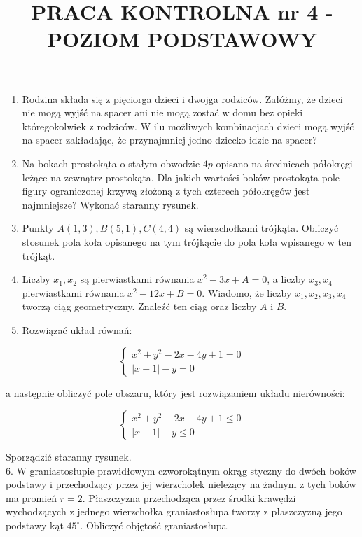 \documentclass[10pt]{article}
\title{PRACA KONTROLNA nr 4 - POZIOM PODSTAWOWY }
\author{}
\date{}
\begin{document}
\maketitle
\begin{enumerate}
  \item Rodzina składa się z pięciorga dzieci i dwojga rodziców. Załóżmy, że dzieci nie mogą wyjść na spacer ani nie mogą zostać w domu bez opieki któregokolwiek z rodziców. W ilu możliwych kombinacjach dzieci mogą wyjść na spacer zakładając, że przynajmniej jedno dziecko idzie na spacer?
  \item Na bokach prostokąta o stałym obwodzie $4 p$ opisano na średnicach półokręgi leżące na zewnątrz prostokąta. Dla jakich wartości boków prostokąta pole figury ograniczonej krzywą złożoną z tych czterech półokręgów jest najmniejsze? Wykonać staranny rysunek.
  \item Punkty $A(1,3), B(5,1), C(4,4)$ są wierzchołkami trójkąta. Obliczyć stosunek pola koła opisanego na tym trójkącie do pola koła wpisanego w ten trójkąt.
  \item Liczby $x_{1}, x_{2}$ są pierwiastkami równania $x^{2}-3 x+A=0$, a liczby $x_{3}, x_{4}$ pierwiastkami równania $x^{2}-12 x+B=0$. Wiadomo, że liczby $x_{1}, x_{2}, x_{3}, x_{4}$ tworzą ciąg geometryczny. Znaleźć ten ciąg oraz liczby $A$ i $B$.
  \item Rozwiązać układ równań:
\end{enumerate}

$$
\left\{\begin{array}{l}
x^{2}+y^{2}-2 x-4 y+1=0 \\
|x-1|-y=0
\end{array}\right.
$$

a następnie obliczyć pole obszaru, który jest rozwiązaniem układu nierówności:

$$
\left\{\begin{array}{l}
x^{2}+y^{2}-2 x-4 y+1 \leqslant 0 \\
|x-1|-y \leqslant 0
\end{array}\right.
$$

Sporządzić staranny rysunek.\\
6. W graniastosłupie prawidłowym czworokątnym okrąg styczny do dwóch boków podstawy i przechodzący przez jej wierzchołek nieleżący na żadnym z tych boków ma promień $r=2$. Płaszczyzna przechodząca przez środki krawędzi wychodzących z jednego wierzchołka graniastosłupa tworzy z płaszczyzną jego podstawy kąt $45^{\circ}$. Obliczyć objętość graniastosłupa.
\end{document}
